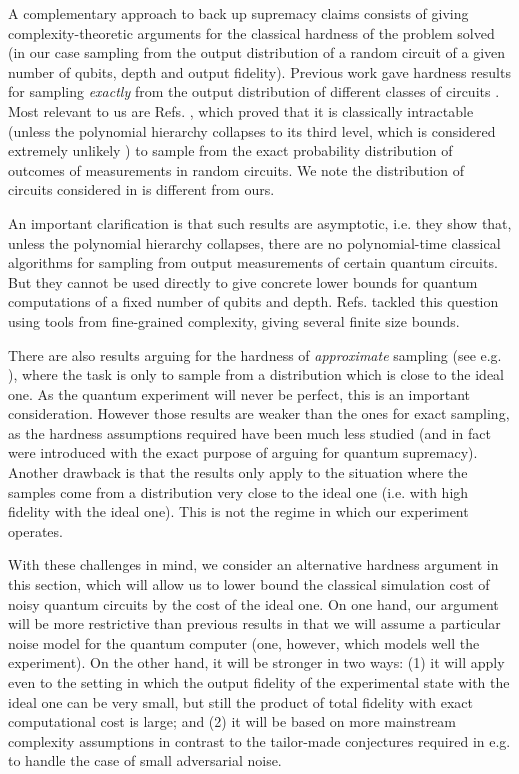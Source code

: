 A complementary approach to back up supremacy claims consists of giving complexity-theoretic arguments for the classical hardness of the problem solved (in our case sampling from the output distribution of a random circuit of a given number of qubits, depth and output fidelity). Previous work gave hardness results for sampling \textit{exactly} from the output distribution of different classes of circuits \cite{AA11, BJS10, HM17, boixo2018characterizing, TD02}. Most relevant to us are Refs. \cite{Bou19, HM18,movassagh2019cayley}, which proved that it is classically intractable (unless the polynomial hierarchy collapses to its third level, which is considered extremely unlikely \cite{AB09}) to sample from the exact probability distribution of outcomes of measurements in random circuits. We note the distribution of circuits considered in \cite{Bou19, HM18,movassagh2019cayley} is different from ours. 

An important clarification is that such results are asymptotic, i.e. they show that, unless the polynomial hierarchy collapses, there are no polynomial-time classical algorithms for sampling from output measurements of certain quantum circuits. But they cannot be used directly to give concrete lower bounds for quantum computations of a fixed number of qubits and depth. Refs. \cite{CNS18, Dal18, MS19} tackled this question using tools from fine-grained complexity, giving several finite size bounds. 

There are also results arguing for the hardness of \textit{approximate} sampling (see e.g. \cite{AA11, BM16, boixo2018characterizing, HM17}), where the task is only to sample from a distribution which is close to the ideal one. As the quantum experiment will never be perfect, this is an important consideration. However those results are weaker than the ones for exact sampling, as the hardness assumptions required have been much less studied (and in fact were introduced with the exact purpose of arguing for quantum supremacy). Another drawback is that the results only apply to the situation where the samples come from a distribution very close to the ideal one (i.e. with high fidelity with the ideal one). This is not the regime in which our experiment operates.

With these challenges in mind, we consider an alternative hardness argument in this section, which will allow us to lower bound the classical simulation cost of noisy quantum circuits by the cost of the ideal one. On one hand, our argument will be more restrictive than previous results in that we will assume a particular noise model for the quantum computer (one, however, which models well the experiment). On the other hand, it will be stronger in two ways: (1) it will apply even to the setting in which the output fidelity of the experimental state with the ideal one can be very small, but still the product of total fidelity with exact computational cost is large; and (2) it will be based on more mainstream complexity assumptions in contrast to the tailor-made conjectures required in e.g. \cite{AA11, BM16, HM17} to handle the case of small adversarial noise. 

